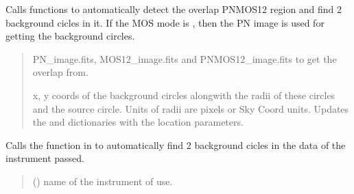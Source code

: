 \documentclass[letterpaper,10pt,english]{sphinxmanual}
\begin{document}
\begin{fulllineitems}
\begin{fulllineitems}
\end{fulllineitems}


\begin{fulllineitems}
\label{\detokenize{xmmPipeline:xmmPipeline.epicObj.epicObj.getBackgroundCircles}}
\pysigstartsignatures
{}
\pysigstopsignatures
\sphinxAtStartPar
Calls  functions to automatically detect the overlap PNMOS12 region and
find 2 background cicles in it.
If the MOS mode is , then the PN image is used for getting the background circles.
\begin{quote}\begin{description}
\sphinxAtStartPar
PN\_image.fits, MOS12\_image.fits and PNMOS12\_image.fits to get the overlap from.

\sphinxAtStartPar
x, y coords of the background circles alongwith the radii of these circles and the
source circle. Units of radii are pixels or Sky Coord units.
Updates the  and  dictionaries with the location
parameters.

\end{description}\end{quote}

\end{fulllineitems}


\begin{fulllineitems}
\label{\detokenize{xmmPipeline:xmmPipeline.epicObj.epicObj.getBackgroundCircles_indi}}
\pysigstartsignatures
{}
\pysigstopsignatures
\sphinxAtStartPar
Calls the  function in  to automatically
find 2 background cicles in the data of the instrument passed.
\begin{quote}\begin{description}
\sphinxAtStartPar
{} () \textendash{} name of the instrument of use.


\end{description}
\end{quote}
\end{fulllineitems}
\end{fulllineitems}
\end{document}
